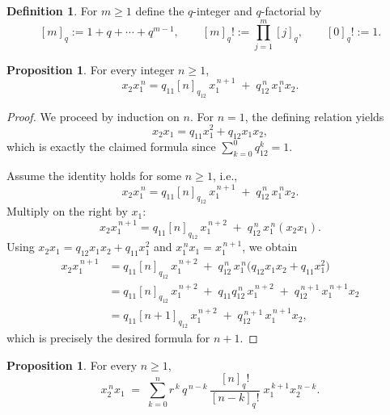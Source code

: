 \documentclass{amsart}
\theoremstyle{definition}
\newtheorem{definition}[theorem]{Definition}
\newtheorem{proposition}[theorem]{Proposition}
\theoremstyle{remark}
\numberwithin{equation}{section}
\begin{document}
\begin{definition}
For $m\ge1$ define the $q$-integer and $q$-factorial by
\[
[m]_q:=1+q+\cdots+q^{m-1},\qquad
[m]_q!:=\prod_{j=1}^{m}[j]_q,\qquad [0]_q!:=1.
\]
\end{definition}

\begin{proposition}\label{prop:x2x1n}
For every integer $n\ge 1$,
\[
x_2x_1^{\,n}
=
q_{11}[n]_{q_{12}}\,x_1^{\,n+1}
\;+\;
q_{12}^{\,n}\,x_1^{\,n}x_2.
\]
\end{proposition}

\begin{proof}
We proceed by induction on $n$. For $n=1$, the defining relation yields
\[
x_2x_1=q_{11}x_1^2+q_{12}x_1x_2,
\]
which is exactly the claimed formula since $\sum_{k=0}^{0}q_{12}^{k}=1$.

Assume the identity holds for some $n\ge1$, i.e.,
\[
x_2x_1^{\,n}
=
q_{11}[n]_{q_{12}}\,x_1^{\,n+1}
\;+\;
q_{12}^{\,n}\,x_1^{\,n}x_2.
\]
Multiply on the right by $x_1$:
\[
x_2x_1^{\,n+1}
=
q_{11}[n]_{q_{12}}\,x_1^{\,n+2}
\;+\;
q_{12}^{\,n}\,x_1^{\,n}(x_2x_1).
\]
Using $x_2x_1=q_{12}x_1x_2+q_{11}x_1^2$ and $x_1^{\,n}x_1=x_1^{\,n+1}$, we obtain
\begin{align*}
x_2x_1^{\,n+1}
&=
q_{11}[n]_{q_{12}}\,x_1^{\,n+2}
\;+\;
q_{12}^{\,n}\,x_1^{\,n}\bigl(q_{12}x_1x_2+q_{11}x_1^2\bigr)\\
&=
q_{11}[n]_{q_{12}}\,x_1^{\,n+2}
\;+\;
q_{11}q_{12}^{\,n}\,x_1^{\,n+2}
\;+\;
q_{12}^{\,n+1}\,x_1^{\,n+1}x_2\\
&=
q_{11}[n+1]_{q_{12}}\,x_1^{\,n+2}
\;+\;
q_{12}^{\,n+1}\,x_1^{\,n+1}x_2,
\end{align*}
which is precisely the desired formula for $n+1$.
\end{proof}

\begin{proposition}\label{prop:NF-x2nx1} For every $n\ge1$,
\[
x_2^{\,n}x_1
\;=\;
\sum_{k=0}^{n} 
r^{\,k}\,q^{\,n-k}\,
\frac{[n]_q!}{[n-k]_q!}\;
x_1^{\,k+1}x_2^{\,n-k}.
\]
\end{proposition}
\end{document}
